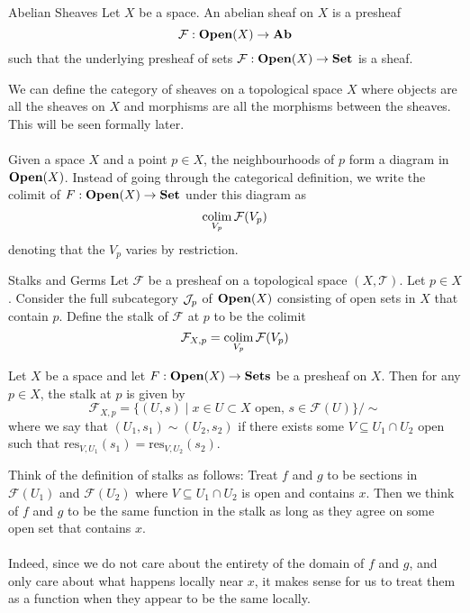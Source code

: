 \documentclass[a4paper]{article}
\begin{document}
\begin{defn}{Abelian Sheaves}{} Let $X$ be a space. An abelian sheaf on $X$ is a presheaf $$\mathcal{F}:\bold{Open}(X)\to\bold{Ab}$$ such that the underlying presheaf of sets $\mathcal{F}:\bold{Open}(X)\to\bold{Set}$ is a sheaf. 
\end{defn}

We can define the category of sheaves on a topological space $X$ where objects are all the sheaves on $X$ and morphisms are all the morphisms between the sheaves. This will be seen formally later. \\~\\

Given a space $X$ and a point $p\in X$, the neighbourhoods of $p$ form a diagram in $\bold{Open}(X)$. Instead of going through the categorical definition, we write the colimit of $F:\bold{Open}(X)\to\bold{Set}$ under this diagram as $$\operatorname*{colim}_{V_p}\mathcal{F}(V_p)$$ denoting that the $V_p$ varies by restriction. 

\begin{defn}{Stalks and Germs}{} Let $\mathcal{F}$ be a presheaf on a topological space $(X,\mathcal{T})$. Let $p\in X$. Consider the full subcategory $\mathcal{J}_p$ of $\bold{Open}(X)$ consisting of open sets in $X$ that contain $p$. Define the stalk of $\mathcal{F}$ at $p$ to be the colimit $$\mathcal{F}_{X,p}=\operatorname*{colim}_{V_p}\mathcal{F}(V_p)$$ 
\end{defn}

\begin{lmm}{}{} Let $X$ be a space and let $F:\bold{Open}(X)\to\bold{Sets}$ be a presheaf on $X$. Then for any $p\in X$, the stalk at $p$ is given by $$\mathcal{F}_{X,p}=\{(U,s)\;|\;x\in U\subset X\text{ open, }s\in\mathcal{F}(U)\}/\sim$$ where we say that $(U_1,s_1)\sim(U_2,s_2)$ if there exists some $V\subseteq U_1\cap U_2$ open such that $\text{res}_{V,U_1}(s_1)=\text{res}_{V,U_2}(s_2)$. 
\end{lmm}

Think of the definition of stalks as follows: Treat $f$ and $g$ to be sections in $\mathcal{F}(U_1)$ and $\mathcal{F}(U_2)$ where $V\subseteq U_1\cap U_2$ is open and contains $x$. Then we think of $f$ and $g$ to be the same function in the stalk as long as they agree on some open set that contains $x$. \\~\\

Indeed, since we do not care about the entirety of the domain of $f$ and $g$, and only care about what happens locally near $x$, it makes sense for us to treat them as a function when they appear to be the same locally. 
\end{document}

